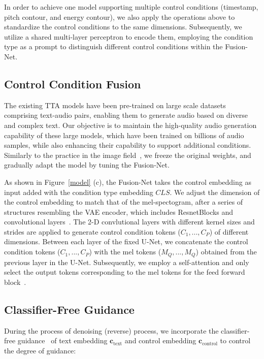 \documentclass[letterpaper]{article}
\begin{document}
In order to achieve one model supporting multiple control conditions (timestamp, pitch contour, and energy contour), we also apply the operations above to standardize the control conditions to the same dimensions. Subsequently, we utilize a shared multi-layer perceptron to encode them, employing the condition type as a prompt to distinguish different control conditions within the Fusion-Net.

\subsection{Control Condition Fusion}
\label{control condition fusion}

The existing TTA models have been pre-trained on large scale datasets comprising text-audio pairs, enabling them to generate audio based on diverse and complex text. Our objective is to maintain the high-quality audio generation capability of these large models, which have been trained on billions of audio samples, while also enhancing their capability to support additional conditions. Similarly to the practice in the image field~\cite{zhang2023adding,li2023gligen}, we freeze the original weights, and gradually adapt the model by tuning the Fusion-Net.

As shown in Figure~\ref{model} (c), the Fusion-Net takes the control embedding as input added with the condition type embedding $CLS$. We adjust the dimension of the control embedding to match that of the mel-spectogram, after a series of structures resembling the VAE encoder, which includes ResnetBlocks and convolutional layers~\cite{kingma2013vae}. The 2-D convlutional layers with different kernel sizes and strides are applied to generate control condition tokens ($C_1, ..., C_P$) of different dimensions. Between each layer of the fixed U-Net, we concatenate the control condition tokens ($C_1, ..., C_P$) with the mel tokens ($M_Q, ..., M_Q$) obtained from the previous layer in the U-Net. Subsequently, we employ a self-attention and only select the output tokens corresponding to the mel tokens for the feed forward block~\cite{li2023gligen}.

\subsection{Classifier-Free Guidance}

During the process of denoising (reverse) process, we incorporate the classifier-free guidance~\cite{jonathan2022classfree} of text embedding $\mathbf{c}_{\text{text}}$ and control embedding $\mathbf{c}_{\text{control}}$ to control the degree of guidance:
\end{document}

